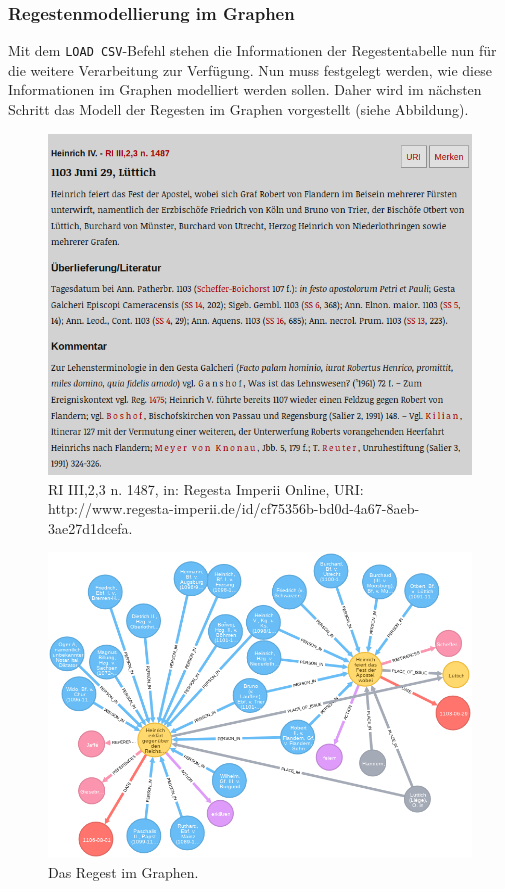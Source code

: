 \documentclass[12pt,ngerman,]{article}
\begin{document}
\subsubsection{Regestenmodellierung im
Graphen}\label{regestenmodellierung-im-graphen-1}

Mit dem \texttt{LOAD\ CSV}-Befehl stehen die Informationen der
Regestentabelle nun für die weitere Verarbeitung zur Verfügung. Nun muss
festgelegt werden, wie diese Informationen im Graphen modelliert werden
sollen. Daher wird im nächsten Schritt das Modell der Regesten im
Graphen vorgestellt (siehe Abbildung).

\begin{figure}
\centering
\includegraphics{Bilder/RI2Graph/ReggH4-Nr-1487.png}
\caption{RI III,2,3 n. 1487, in: Regesta Imperii Online, URI:
http://www.regesta-imperii.de/id/cf75356b-bd0d-4a67-8aeb-3ae27d1dcefa.}
\end{figure}

\begin{figure}
\centering
\includegraphics{Bilder/RI2Graph/ReggH4-Nr-1487imGraph.png}
\caption{Das Regest im Graphen.}
\end{figure}
\end{document}
